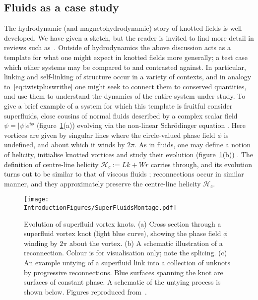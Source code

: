 \subsection{Fluids as a case study}
The hydrodynamic (and magnetohydrodynamic) story of knotted fields is well developed. We have given a sketch, but the reader is invited to find more detail in reviews such as~\citep{Moffatt2014, Irvine2018}. Outside of hydrodynamics the above discussion acts as a template for what one might expect in knotted fields more generally; a test case which other systems may be compared to and contrasted against. In particular, linking and self-linking of structure occur in a variety of contexts, and in analogy to~\eqref{eq:twistpluswrithe} one might seek to connect them to conserved quantities, and use them to understand the dynamics of the entire system under study. To give a brief example of a system for which this template is fruitful consider superfluids, close cousins of normal fluids described by a complex scalar field $\psi = |\psi| e^{i \phi}$ (figure~\ref{fig:SuperFluidMontage}(a)) evolving via the non-linear Schr\"odinger equation \citep{Kleckner2016}. Here vortices are given by singular lines where the circle-valued phase field $\phi$ is undefined, and about which it winds by $2\pi$. As in fluids, one may define a notion of helicity, initialise knotted vortices and study their evolution (figure~\ref{fig:SuperFluidMontage}(b)) \citep{Scheeler2014, Kleckner2016}. The definition of centre-line helicity $\mathcal{H}_c := Lk + Wr$ carries through, and its evolution turns out to be similar to that of viscous fluids \citep{Scheeler2014, Kleckner2016}; reconnections occur in similar manner, and they approximately preserve the centre-line helicity $\mathcal{H}_c$.
\begin{figure}[htbp]
\centering
\texttt{[image: \\IntroductionFigures/SuperFluidsMontage.pdf]}
    \caption[Superfluid vortex knots.]{Evolution of superfluid vortex knots. (a) Cross section through a superfluid vortex knot (light blue curve), showing the phase field $\phi$ winding by $2 \pi$ about the vortex. (b) A schematic illustration of a reconnection. Colour is for visualisation only; note the splicing. (c) An example untying of a superfluid link into a collection of unknots by progressive reconnections. Blue surfaces spanning the knot are surfaces of constant phase. A schematic of the untying process is shown below. Figures reproduced from~\citep{Kleckner2016}.}
\label{fig:SuperFluidMontage}
\end{figure}

